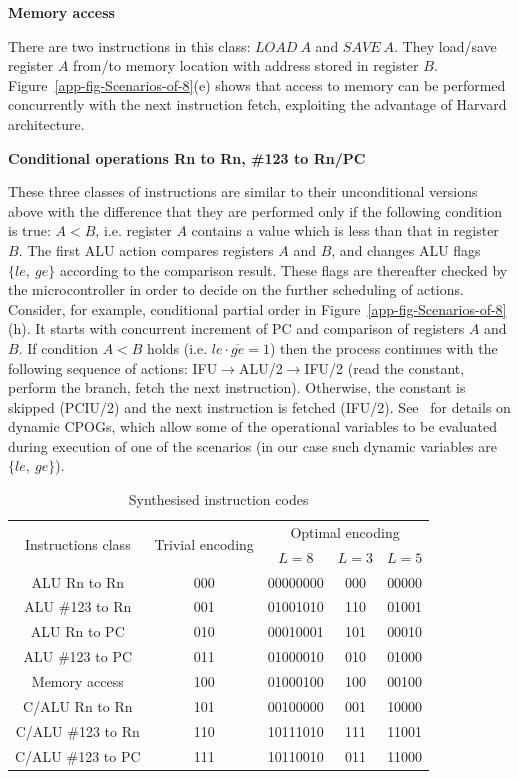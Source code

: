 \textbf{Memory access}

There are two instructions in this class: $\mathit{LOAD\ A}$ and
$\mathit{SAVE\ A}$. They load/save register $A$ from/to memory location
with address stored in register $B$. Figure~\ref{app-fig-Scenarios-of-8}(e)
shows that access to memory can be performed concurrently with the
next instruction fetch, exploiting the advantage of Harvard architecture.

\textbf{Conditional operations Rn to Rn, \#123 to Rn/PC}

These three classes of instructions are similar to their unconditional
versions above with the difference that they are performed only if
the following condition is true: $A<B$, i.e. register $A$ contains
a value which is less than that in register $B$. The first ALU action
compares registers $A$ and $B$, and changes ALU flags $\{le,\ ge\}$
according to the comparison result. These flags are thereafter checked
by the microcontroller in order to decide on the further scheduling
of actions. Consider, for example, conditional partial order in Figure~\ref{app-fig-Scenarios-of-8}(h).
It starts with concurrent increment of PC and comparison of registers
$A$ and $B$. If condition $A<B$ holds (i.e. $le\cdot\overline{ge}=1$)
then the process continues with the following sequence of actions:
IFU$\rightarrow$ALU/2$\rightarrow$IFU/2 (read the constant, perform
the branch, fetch the next instruction). Otherwise, the constant is
skipped (PCIU/2) and the next instruction is fetched (IFU/2). See~\cite{2009_mokhov_phd}
for details on dynamic CPOGs, which allow some of the operational
variables to be evaluated during execution of one of the scenarios
(in our case such dynamic variables are $\{le,\ ge\}$).

\begin{table}[h]
\centering

\begin{tabular}{|c||c|c|c|c|}
\hline 
\multirow{2}{*}{Instructions class} & 
\multirow{2}{*}{Trivial encoding} & 
\multicolumn{3}{c|}{ Optimal encoding} \tabularnewline
\cline{3-5}
& & $L=8$ & {$L=3$} & {$L=5$} \tabularnewline
\hline 
\hline 
{ ALU Rn to Rn} & { 000} & { 00000000} & { 000} & { 00000}\tabularnewline
\hline 
{ ALU \#123 to Rn} & { 001} & { 01001010} & { 110} & { 01001}\tabularnewline
\hline 
{ ALU Rn to PC} & { 010} & { 00010001} & { 101} & { 00010}\tabularnewline
\hline 
{ ALU \#123 to PC} & { 011} & { 01000010} & { 010} & { 01000}\tabularnewline
\hline 
{ Memory access} & { 100} & { 01000100} & { 100} & { 00100}\tabularnewline
\hline 
{ C/ALU Rn to Rn} & { 101} & { 00100000} & { 001} & { 10000}\tabularnewline
\hline 
{ C/ALU \#123 to Rn} & { 110} & { 10111010} & { 111} & { 11001}\tabularnewline
\hline 
{ C/ALU \#123 to PC} & { 111} & { 10110010} & { 011} & { 11000}\tabularnewline
\hline 
\end{tabular}

\caption{Synthesised instruction codes\label{tab:Synthesised-instruction-codes}}
\end{table}




